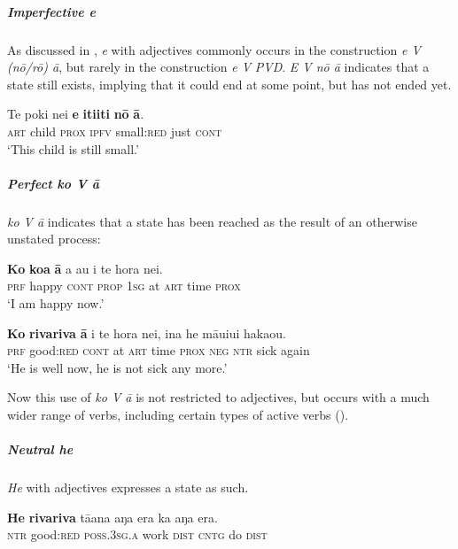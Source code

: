 \subparagraph{Imperfective \textit{e}} As discussed in , \textit{e} with adjectives commonly occurs in the construction \textit{e V (nō/rō) {\ꞌ}ā}, but rarely in the construction \textit{e V} \textit{PVD}. \textit{E V nō {\ꞌ}ā} indicates that a state still exists, implying that it could end at some point, but has not ended yet.

\ea\label{ex:3.99}
\gll Te poki nei \textbf{e} \textbf{{\ꞌ}iti{\ꞌ}iti} \textbf{nō} \textbf{{\ꞌ}ā}.\\
\textsc{art} child \textsc{prox} \textsc{ipfv} small:\textsc{red} just \textsc{cont}\\

\glt 
‘This child is still small.’ \textstyleExampleref{[R532-14.007]}
\z

\subparagraph{Perfect \textit{ko} \textit{V {\ꞌ}ā}} \textit{ko V {\ꞌ}ā} indicates that a state has been reached as the result of an otherwise unstated process:

\ea\label{ex:3.100}
\gll \textbf{Ko} \textbf{koa} \textbf{{\ꞌ}ā} a au {\ꞌ}i te hora nei. \\
\textsc{prf} happy \textsc{cont} \textsc{prop} \textsc{1sg} at \textsc{art} time \textsc{prox} \\

\glt 
‘I am happy now.’ \textstyleExampleref{[R214.053]} 
\z

\ea\label{ex:3.101}
\gll \textbf{Ko} \textbf{rivariva} \textbf{{\ꞌ}ā} {\ꞌ}i te hora nei, {\ꞌ}ina he māuiui haka{\ꞌ}ou.\\
\textsc{prf} good:\textsc{red} \textsc{cont} at \textsc{art} time \textsc{prox} \textsc{neg} \textsc{ntr} sick again\\

\glt
‘He is well now, he is not sick any more.’ \textstyleExampleref{[R103.234]} 
\z

Now this use of \textit{ko V {\ꞌ}ā} is not restricted to adjectives, but occurs with a much wider range of verbs, including certain types of active verbs ().

\subparagraph{Neutral \textit{he}} \textit{He} with adjectives expresses a state as such. 

\ea\label{ex:3.102}
\gll \textbf{He} \textbf{rivariva} tā{\ꞌ}ana aŋa era ka aŋa era.\\
\textsc{ntr} good:\textsc{red} \textsc{poss.3sg.a} work \textsc{dist} \textsc{cntg} do \textsc{dist}\\

